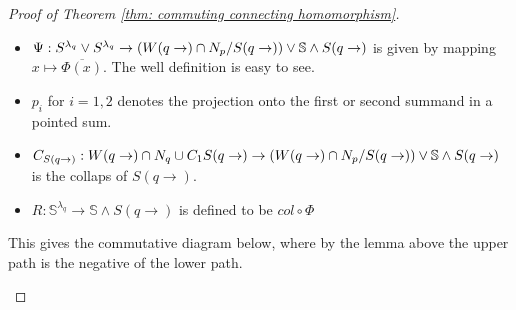 \begin{proof}[Proof of Theorem \ref{thm: commuting connecting homomorphism}]
\begin{itemize}
\begin{itemize}
				\begin{align*}
					\restr{\Phi}{{H}_+}(x)&=E^u_q\circ B_{\mathfrak{b}^q}^{-1}\circ \pi(x)\\
					\restr{\Phi}{{H}_-}(x)&=(\euler^{\tau(y)},\rho (y))\text{ where }y=E^u_q\circ B_{\mathfrak{b}^q}(\pi_-(x)) \,.
				\end{align*}Notice, how this function is continuous and does not depend on the choice taken in the definition of $\rho'$. 
				\item $\Psi: S^{\lambda_q}\vee S^{\lambda_q}\to \left(W(q\to)\cap N_p \middle/ S(q\to)\right)\vee \mathbb{S}\wedge S(q\to)$ is given by mapping $x\mapsto \overline{\Phi(x)}$. The well definition is easy to see. 
				\item $p_i$ for $i=1,2$ denotes the projection onto the first or second summand in a pointed sum. 
				\item $C_{S(q\to)}:W(q\to)\cap N_q\cup C_1S(q\to) \to \left(W(q\to)\cap N_p \middle/ S(q\to)\right)\vee \mathbb{S}\wedge S(q\to)$ is the collaps of $S(q\to)$. 
				\item $R:\mathbb{S}^{\lambda_q}\to \mathbb{S} \wedge S(q\to)$ is defined to be $col\circ \Phi$ 
			\end{itemize}
			This gives the commutative diagram below, where by the lemma above the upper path is the negative of the lower path.
			\begin{fdiagram}

\end{fdiagram}
\end{itemize}
\end{proof}
